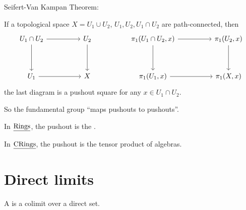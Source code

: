 \begin{examples*}
	\item Seifert-Van Kampan Theorem:

		\vspace*{2mm}

		If a topological space \( X = U_1 \cup U_2 \), \( U_1, U_2, U_1 \cap U_2 \) are path-connected, then
		\[
			\begin{tikzcd}{U_1\cap U_2} && {U_2} && {\pi_1(U_1\cap U_2, x)} && {\pi_1(U_2, x)} \\
				\\
				{U_1} && X && {\pi_1(U_1, x)} && {\pi_1(X, x)}
				\arrow[from=1-1, to=1-3]
				\arrow[from=1-1, to=3-1]
				\arrow[from=1-3, to=3-3]
				\arrow[from=1-5, to=1-7]
				\arrow[from=1-5, to=3-5]
				\arrow[from=1-7, to=3-7]
				\arrow[from=3-1, to=3-3]
				\arrow[from=3-5, to=3-7]
			\end{tikzcd}
		\]
		the last diagram is a pushout square for any \( x \in U_1 \cap U_2 \).

		\vspace*{2mm}

		So the fundamental group \enquote{maps pushouts to pushouts}.

	\item In \( \underline{\mathrm{Rings}} \), the pushout is the .

	\item In \( \underline{\mathrm{CRings}} \), the pushout is the tensor product of algebras.
\end{examples*}

\section{Direct limits}

\begin{definition*}
	A  is a colimit over a direct set.
\end{definition*}

